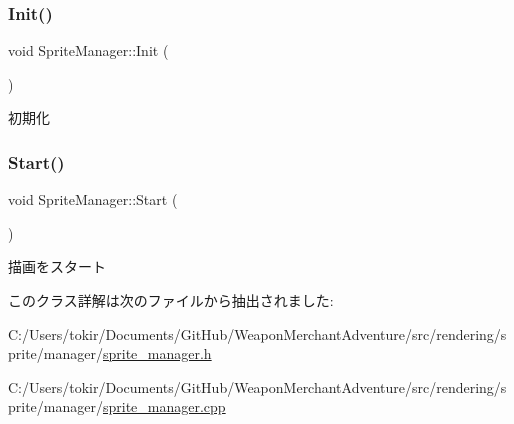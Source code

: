 \subsubsection{\texorpdfstring{Init()}{Init()}}
{\footnotesize\ttfamily void Sprite\+Manager\+::\+Init (\begin{DoxyParamCaption}{ }\end{DoxyParamCaption})}



初期化 

\mbox{\label{class_sprite_manager_a6b387e8736713264f6d590082cd492cb}} 
\subsubsection{\texorpdfstring{Start()}{Start()}}
{\footnotesize\ttfamily void Sprite\+Manager\+::\+Start (\begin{DoxyParamCaption}{ }\end{DoxyParamCaption})\hspace{0.3cm}{\ttfamily [inline]}}



描画をスタート 



このクラス詳解は次のファイルから抽出されました\+:\begin{DoxyCompactItemize}
\item 
C\+:/\+Users/tokir/\+Documents/\+Git\+Hub/\+Weapon\+Merchant\+Adventure/src/rendering/sprite/manager/\mbox{\hyperlink{sprite__manager_8h}{sprite\+\_\+manager.\+h}}\item 
C\+:/\+Users/tokir/\+Documents/\+Git\+Hub/\+Weapon\+Merchant\+Adventure/src/rendering/sprite/manager/\mbox{\hyperlink{sprite__manager_8cpp}{sprite\+\_\+manager.\+cpp}}\end{DoxyCompactItemize}

